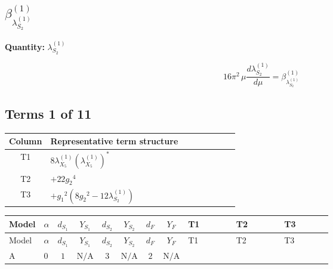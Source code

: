 \documentclass[8pt]{article}
\begin{document}
\begin{landscape}
\section*{$\beta_{\lambda_{S_2}^{(1)}}^{(1)}$}
\noindent\textbf{Quantity: }$\lambda_{S_2}^{(1)}$\par\smallskip
\[16\pi^2\,\mu\frac{d \lambda_{S_2}^{(1)}}{d\mu}=\beta_{\lambda_{S_2}^{(1)}}^{(1)}\]
\subsection*{Terms 1 of 11}
\begin{center}
\begin{tabular}{@{}c >{\raggedright\arraybackslash}p{0.82\linewidth}@{}}
\toprule
Column & Representative term structure \\
\midrule
T1 & \(\displaystyle 8 {\lambda_{X_{5}}^{(1)}} \left({\lambda_{X_{5}}^{(1)}}\right)^{*}\) \\
\midrule
T2 & \(\displaystyle +22 {g_2}^4\) \\
\midrule
T3 & \(\displaystyle +{g_1}^2 \left(8 {g_2}^2-12 {\lambda_{S_2}^{(1)}}\right)\) \\
\midrule
\bottomrule
\end{tabular}
\end{center}
\smallskip
\tiny
\begin{longtable}{@{}llcccccc >{\raggedright\arraybackslash}p{0.21\linewidth} >{\raggedright\arraybackslash}p{0.21\linewidth} >{\raggedright\arraybackslash}p{0.21\linewidth}@{}}
\toprule
Model & $\alpha$ & $d_{S_1}$ & $Y_{S_1}$ & $d_{S_2}$ & $Y_{S_2}$ & $d_F$ & $Y_F$ & T1 & T2 & T3 \\
\midrule
\endfirsthead
\toprule
Model & $\alpha$ & $d_{S_1}$ & $Y_{S_1}$ & $d_{S_2}$ & $Y_{S_2}$ & $d_F$ & $Y_F$ & T1 & T2 & T3 \\
\midrule
\endhead
A & $0$ & $1$ & $\text{N/A}$ & $3$ & $\text{N/A}$ & $2$ & $\text{N/A}$ & \scriptsize\adjustbox{max width=\linewidth}{$\begin{gathered} 8 {\lambda_{X_{5}}^{(1)}} \left({\lambda_{X_{5}}^{(1)}}\right)^{*}\end{gathered}$} & \scriptsize\adjustbox{max width=\linewidth}{$\begin{gathered} +22 {g_2}^4\end{gathered}$} & \scriptsize\adjustbox{max width=\linewidth}{$\begin{gathered} +{g_1}^2 \left(8 {g_2}^2-12 {\lambda_{S_2}^{(1)}}\right)\end{gathered}$} \\

\end{longtable}
\end{landscape}
\end{document}
